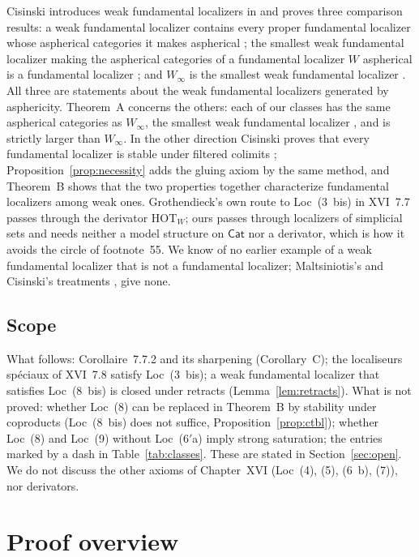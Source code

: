 \documentclass[11pt,a4paper]{article}
\theoremstyle{definition}
\newcommand{\Cat}{\mathsf{Cat}}
\newcommand{\Winf}{W_{\infty}}
\begin{document}
Cisinski introduces weak fundamental localizers in \cite[6.1.12]{Cis06} and proves three
comparison results: a weak fundamental localizer contains every proper fundamental localizer
whose aspherical categories it makes aspherical \cite[Prop.~6.1.16]{Cis06}; the smallest weak
fundamental localizer making the aspherical categories of a fundamental localizer $W$
aspherical is a fundamental localizer \cite[Cor.~6.1.17]{Cis06}; and $\Winf$ is the smallest
weak fundamental localizer \cite[Th.~6.1.18]{Cis06}. All three are statements about the weak
fundamental localizers generated by asphericity. Theorem~A concerns the others: each of our
classes has the same aspherical categories as $\Winf$, the smallest weak fundamental localizer
\cite[Th.~6.1.18]{Cis06}, and is strictly larger than $\Winf$. In the other direction
Cisinski proves that every fundamental localizer is stable under filtered colimits
\cite[Cor.~4.2.22]{Cis06}; Proposition~\ref{prop:necessity} adds the gluing axiom by the same
method, and Theorem~B shows that the two properties together characterize fundamental
localizers among weak ones. Grothendieck's own route to Loc~(3~bis) in XVI~7.7 passes through
the derivator $\mathrm{HOT}_W$; ours passes through localizers of simplicial sets and needs
neither a model structure on $\Cat$ nor a derivator, which is how it avoids the circle of
footnote~55. We know of no earlier example of a weak fundamental localizer that is not a
fundamental localizer; Maltsiniotis's and Cisinski's treatments \cite[\S1.1]{Mal05},
\cite[\S6.1]{Cis06} give none.

\subsection{Scope}\label{subsec:scope}

What follows: Corollaire~7.7.2 and its sharpening (Corollary~C); the localiseurs sp\'eciaux of
XVI~7.8 satisfy Loc~(3~bis); a weak fundamental localizer that satisfies Loc~(8~bis) is closed
under retracts (Lemma~\ref{lem:retracts}). What is not proved: whether Loc~(8) can be replaced
in Theorem~B by stability under coproducts (Loc~(8~bis) does not suffice,
Proposition~\ref{prop:ctbl}); whether Loc~(8) and Loc~(9)
without Loc~($6'$a) imply strong saturation; the entries marked by a dash in
Table~\ref{tab:classes}. These are stated in Section~\ref{sec:open}. We do not discuss the
other axioms of Chapter~XVI (Loc~(4), (5), (6~b), (7)), nor derivators.

\section{Proof overview}\label{sec:overview}
\end{document}

